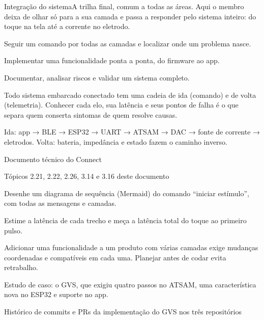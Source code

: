 \begin{parte}{Integração do sistema}{A trilha final, comum a todas as áreas. Aqui o membro deixa de olhar só para a sua camada e passa a responder pelo sistema inteiro: do toque na tela até a corrente no eletrodo.}
  \item Seguir um comando por todas as camadas e localizar onde um problema nasce.
  \item Implementar uma funcionalidade ponta a ponta, do firmware ao app.
  \item Documentar, analisar riscos e validar um sistema completo.
\end{parte}

Todo sistema embarcado conectado tem uma cadeia de ida (comando) e de volta (telemetria). Conhecer cada elo, sua latência e seus pontos de falha é o que separa quem conserta sintomas de quem resolve causas.

\begin{noproduto}
Ida: app → BLE → ESP32 → UART → ATSAM → DAC → fonte de corrente → eletrodos. Volta: bateria, impedância e estado fazem o caminho inverso.
\end{noproduto}

\begin{paraestudar}
  \item Documento técnico do Connect
  \item Tópicos 2.21, 2.22, 2.26, 3.14 e 3.16 deste documento
\end{paraestudar}

\begin{pratique}
  \item Desenhe um diagrama de sequência (Mermaid) do comando “iniciar estímulo”, com todas as mensagens e camadas.
  \item Estime a latência de cada trecho e meça a latência total do toque ao primeiro pulso.
\end{pratique}

Adicionar uma funcionalidade a um produto com várias camadas exige mudanças coordenadas e compatíveis em cada uma. Planejar antes de codar evita retrabalho.

\begin{noproduto}
Estudo de caso: o GVS, que exigiu quatro passos no ATSAM, uma característica nova no ESP32 e suporte no app.
\end{noproduto}

\begin{paraestudar}
  \item Histórico de commits e PRs da implementação do GVS nos três repositórios
\end{paraestudar}

